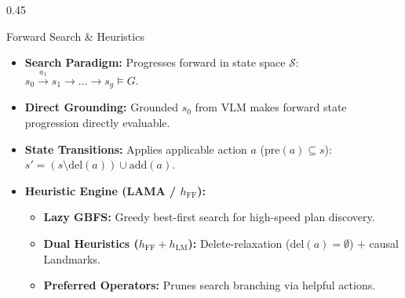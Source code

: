 \documentclass[10pt]{beamer}
\begin{document}
\begin{frame}[t]
\begin{columns}[T]
        \begin{column}{0.45\textwidth}
            \begin{block}{Forward Search \& Heuristics}
                \begin{itemize}\scriptsize
                    \setlength\itemsep{0.20em}
                    \item \textbf{Search Paradigm:} Progresses forward in state space $\mathcal{S}$: $s_0 \xrightarrow{a_1} s_1 \to \dots \to s_g \models G$.
                    \item \textbf{Direct Grounding:} Grounded $s_0$ from VLM makes forward state progression directly evaluable.
                    \item \textbf{State Transitions:} Applies applicable action $a$ ($\text{pre}(a) \subseteq s$):
                    $s' = (s \setminus \text{del}(a)) \cup \text{add}(a)$.
                    \vspace{0.06cm}
                    \item \textbf{Heuristic Engine (LAMA / $h_{\text{FF}}$):}
                    \begin{itemize}\scriptsize
                        \setlength\itemsep{0.15em}
                        \item \textbf{Lazy GBFS:} Greedy best-first search for high-speed plan discovery.
                        \item \textbf{Dual Heuristics ($h_{\text{FF}} + h_{\text{LM}}$):} Delete-relaxation ($\text{del}(a) = \emptyset$) + causal Landmarks.
                        \item \textbf{Preferred Operators:} Prunes search branching via helpful actions.
                    \end{itemize}
                \end{itemize}
            \end{block}
        \end{column}
    \end{columns}
\end{frame}
\end{document}
